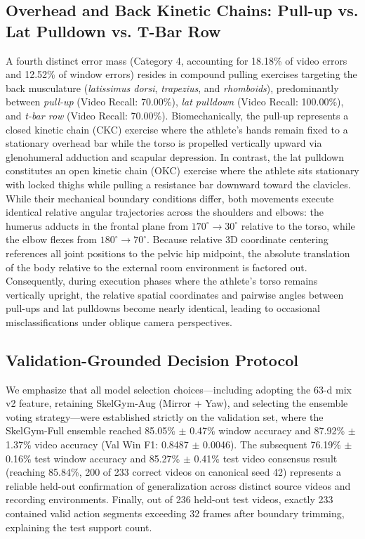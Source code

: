 \documentclass[runningheads]{llncs}
\begin{document}
\subsection{Overhead and Back Kinetic Chains: Pull-up vs. Lat Pulldown vs. T-Bar Row}
A fourth distinct error mass (Category 4, accounting for 18.18\% of video errors and 12.52\% of window errors) resides in compound pulling exercises targeting the back musculature (\textit{latissimus dorsi}, \textit{trapezius}, and \textit{rhomboids}), predominantly between \textit{pull-up} (Video Recall: 70.00\%), \textit{lat pulldown} (Video Recall: 100.00\%), and \textit{t-bar row} (Video Recall: 70.00\%).
Biomechanically, the pull-up represents a closed kinetic chain (CKC) exercise where the athlete's hands remain fixed to a stationary overhead bar while the torso is propelled vertically upward via glenohumeral adduction and scapular depression. In contrast, the lat pulldown constitutes an open kinetic chain (OKC) exercise where the athlete sits stationary with locked thighs while pulling a resistance bar downward toward the clavicles. While their mechanical boundary conditions differ, both movements execute identical relative angular trajectories across the shoulders and elbows: the humerus adducts in the frontal plane from $170^\circ \to 30^\circ$ relative to the torso, while the elbow flexes from $180^\circ \to 70^\circ$. Because relative 3D coordinate centering references all joint positions to the pelvic hip midpoint, the absolute translation of the body relative to the external room environment is factored out. Consequently, during execution phases where the athlete's torso remains vertically upright, the relative spatial coordinates and pairwise angles between pull-ups and lat pulldowns become nearly identical, leading to occasional misclassifications under oblique camera perspectives.

\subsection{Validation-Grounded Decision Protocol}\label{sec:val_protocol}
We emphasize that all model selection choices---including adopting the 63-d mix v2 feature, retaining SkelGym-Aug (Mirror + Yaw), and selecting the ensemble voting strategy---were established strictly on the validation set, where the SkelGym-Full ensemble reached 85.05\% $\pm$ 0.47\% window accuracy and 87.92\% $\pm$ 1.37\% video accuracy (Val Win F1: 0.8487 $\pm$ 0.0046). The subsequent 76.19\% $\pm$ 0.16\% test window accuracy and 85.27\% $\pm$ 0.41\% test video consensus result (reaching 85.84\%, 200 of 233 correct videos on canonical seed 42) represents a reliable held-out confirmation of generalization across distinct source videos and recording environments. Finally, out of 236 held-out test videos, exactly 233 contained valid action segments exceeding 32 frames after boundary trimming, explaining the test support count.
\end{document}
